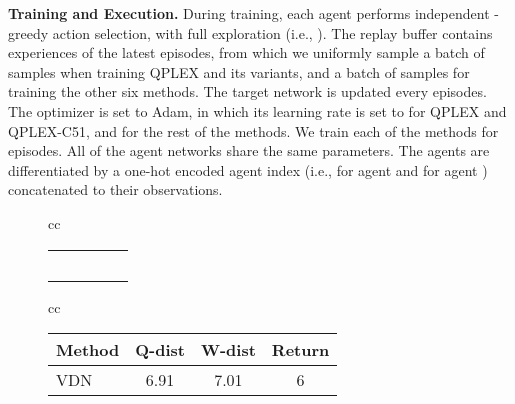 \documentclass[twoside,11pt]{article}
\newcommand{\bb}[1]{\textcolor{myblue}{#1}}
\newcommand{\cc}[1]{\textcolor{crimson}{#1}}
\begin{document}
\textbf{Training and Execution.}
During training, each agent performs independent -greedy action selection, with full exploration (i.e., ). The replay buffer contains experiences of the latest  episodes, from which we uniformly sample a batch of  samples when training QPLEX and its variants, and a batch of  samples for training the other six methods. The target network is updated every  episodes. The optimizer is set to Adam, in which its learning rate is set to  for QPLEX and QPLEX-C51, and  for the rest of the methods. We train each of the methods for  episodes. All of the agent networks share the same parameters. The agents are differentiated by a one-hot encoded agent index (i.e.,  for agent  and  for agent ) concatenated to their observations.

\begin{figure*}[t]
\begin{tabular}{cc}
\begin{minipage}{0.47\textwidth}
\small
\setlength{\extrarowheight}{3pt}
\vspace{-0.3cm}\hspace{-0.5cm}
\begin{tabular}{cc|*{3}{>{\centering\arraybackslash}p{.22\linewidth}|}}
	& \multicolumn{1}{c}{} & \multicolumn{3}{c}{\bb{Agent }} \\
	& \multicolumn{1}{c}{} & \multicolumn{1}{c}{\bb{}} & \multicolumn{1}{c}{\bb{}} & \multicolumn{1}{c}{\bb{}} \\ 
	\cline{3-5}
    \multirow{2}{*}{\rotatebox[origin=c]{90}{\cc{Agent }}} & \cc{} &  &  &  \\ \cline{3-5}
    & \cc{} &  &  &   \\\cline{3-5}
    & \cc{} &  &  &   \\\cline{3-5}
\end{tabular}
\label{table:matrix-game}
\end{minipage}
\begin{tabular}{cc}
\begin{minipage}{0.45\textwidth}
\footnotesize
{}
\begin{tabular}{l|c|c|c}
\toprule
Method & Q-dist & W-dist & Return \\
\midrule
VDN & 6.91 & 7.01 & 6 \\

\end{tabular}
\end{minipage}
\end{tabular}
\end{tabular}
\end{figure*}
\end{document}

